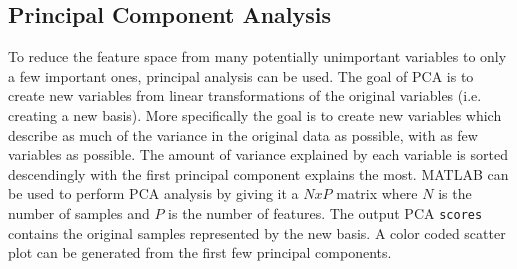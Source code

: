 \subsection{Principal Component Analysis}
To reduce the feature space from many potentially unimportant variables to only a few important ones, principal analysis can be used. 
The goal of PCA is to create new variables from linear transformations of the original variables (i.e. creating a new basis). More specifically the goal is to create new variables which describe as much of the variance in the original data as possible, with as few variables as possible. 
The amount of variance explained by each variable is sorted descendingly with the first principal component explains the most. MATLAB can be used to perform PCA analysis by giving it a $NxP$ matrix where $N$ is the number of samples and $P$ is the number of features. The output PCA \texttt{scores} contains the original samples represented by the new basis.  
A color coded scatter plot can be generated from the first few principal components. 

